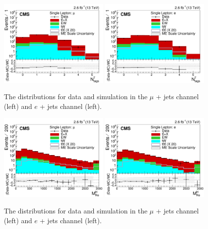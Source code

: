 \begin{figure}[ht!]
    \includegraphics[width=0.48\textwidth]{images/Run2/nTtags_StackLogY.pdf}
    \includegraphics[width=0.48\textwidth]{images/Run2/nTtags_StackLogY_e.pdf}
    \caption{The \nTtags distributions for data and simulation in the $\mu$ + jets channel (left) and $e$ + jets channel (left).}
    \label{fig:nTtagsInc}
\end{figure}

\begin{figure}[ht!]
    \includegraphics[width=0.48\textwidth]{images/Run2/SumJetMassX_StackLogY.pdf}
    \includegraphics[width=0.48\textwidth]{images/Run2/SumJetMassX_StackLogY_e.pdf}
    \caption{The \redhadmass distributions for data and simulation in the $\mu$ + jets channel (left) and $e$ + jets channel (left).}
    \label{fig:SumJetMassX}
\end{figure}

